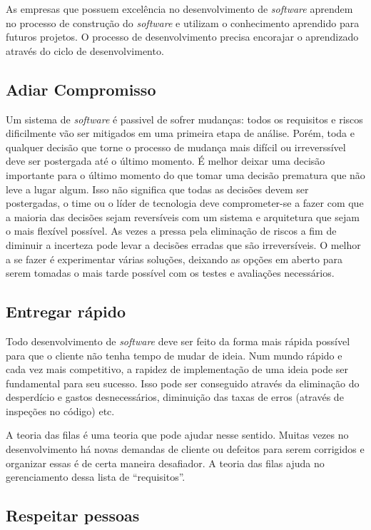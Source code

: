 As empresas que possuem excelência no desenvolvimento de \textit{software} aprendem no processo de construção do \textit{software} e utilizam o conhecimento aprendido para futuros projetos. O processo de desenvolvimento precisa encorajar o aprendizado através do ciclo de desenvolvimento. 


\subsection{Adiar Compromisso}

Um sistema de \textit{software} é passivel de sofrer mudanças: todos os requisitos e riscos dificilmente vão ser mitigados em uma primeira etapa de análise. Porém, toda e qualquer decisão que torne o processo de mudança mais difícil ou irreverssível deve ser postergada até o último momento. É melhor deixar uma decisão importante para o último momento do que tomar uma decisão prematura que não leve a lugar algum. Isso não significa que todas as decisões devem ser postergadas, o time ou o líder de tecnologia deve comprometer-se a fazer com que a maioria das decisões sejam reversíveis com um sistema e arquitetura que sejam o mais flexível possível. As vezes a pressa pela eliminação de riscos a fim de diminuir a incerteza pode levar a decisões erradas que são irreversíveis. O melhor a se fazer é experimentar várias soluções, deixando as opções em aberto para serem tomadas o mais tarde possível com os testes e avaliações necessários.

\subsection{Entregar rápido}

Todo desenvolvimento de \textit{software} deve ser feito da forma mais rápida possível para que o cliente não tenha tempo de mudar de ideia. Num mundo rápido e cada vez mais competitivo, a rapidez de implementação de uma ideia pode ser fundamental para seu sucesso. Isso pode ser conseguido através da eliminação do desperdício e gastos desnecessários, diminuição das taxas de erros (através de inspeções no código) etc.

A teoria das filas é uma teoria que pode ajudar nesse sentido. Muitas vezes no desenvolvimento há novas demandas de cliente ou defeitos para serem corrigidos e organizar essas é de certa maneira desafiador. A teoria das filas ajuda no gerenciamento dessa lista de ``requisitos''.

\subsection{Respeitar pessoas}

